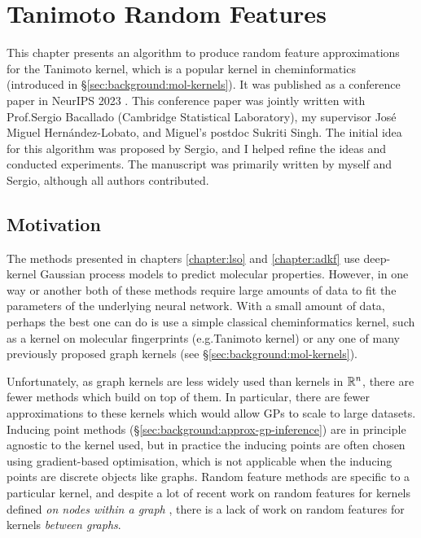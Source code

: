 \chapter{Tanimoto Random Features}
\label{chapter:trf}

This chapter presents an algorithm to produce random feature
approximations for the Tanimoto kernel,
which is a popular kernel in cheminformatics
(introduced in \S\ref{sec:background:mol-kernels}).
It was published as a conference paper
in NeurIPS 2023 \citep{tripp2023tanimoto}.
This conference paper was jointly written with
Prof.\@ Sergio Bacallado (Cambridge Statistical Laboratory),
my supervisor José Miguel Hernández-Lobato,
and Miguel's postdoc Sukriti Singh.
The initial idea for this algorithm was proposed by Sergio,
and I helped refine the ideas and conducted experiments.
The manuscript was primarily written by myself and Sergio,
although all authors contributed.

\section{Motivation}
\label{sec:trf:motivation}

The methods presented in chapters \ref{chapter:lso} and \ref{chapter:adkf}
use deep-kernel Gaussian process models to predict molecular properties.
However, in one way or another both of these methods require large amounts of data
to fit the parameters of the underlying neural network.
With a small amount of data,
perhaps the best one can do is use a simple classical cheminformatics kernel,
such as a kernel on molecular fingerprints (e.g.\@ Tanimoto kernel)
or any one of many previously proposed graph kernels (see \S\ref{sec:background:mol-kernels}).

Unfortunately, as graph kernels are less widely used than kernels in $\mathbb{R}^n$,
there are fewer methods which build on top of them.
In particular, there are fewer approximations to these kernels
which would allow GPs to scale to large datasets.
Inducing point methods (\S\ref{sec:background:approx-gp-inference})
are in principle agnostic to the kernel used,
but in practice the inducing points are often chosen using gradient-based optimisation,
which is not applicable when the inducing points are discrete objects like graphs.
Random feature methods are specific to a particular kernel,
and despite a lot of recent work on random features for kernels defined
\emph{on nodes within a graph} \citep{reid2023quasi,reid2024repelling,reid2024universal},
there is a lack of work on random features for kernels \emph{between graphs}.

